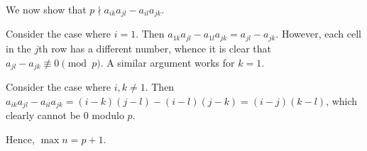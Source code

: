 \begin{solution*}
    We now show that $p \nmid a_{ik}a_{jl} - a_{il}a_{jk}$.

     Consider the case where $i = 1$. Then $a_{1k}a_{jl} - a_{1l}a_{jk} = a_{jl} - a_{jk}$. However, each cell in the $j$th row has a different number, whence it is clear that $a_{jl} - a_{jk} \not\equiv 0 \pmod{p}$. A similar argument works for $k=1$.

     Consider the case where $i, k \neq 1$. Then $a_{ik}a_{jl} - a_{il}a_{jk} = (i-k)(j-l) - (i-l)(j-k) = (i-j)(k-l)$, which clearly cannot be 0 modulo $p$.

    Hence, $\max n = p + 1$.
\end{solution*}